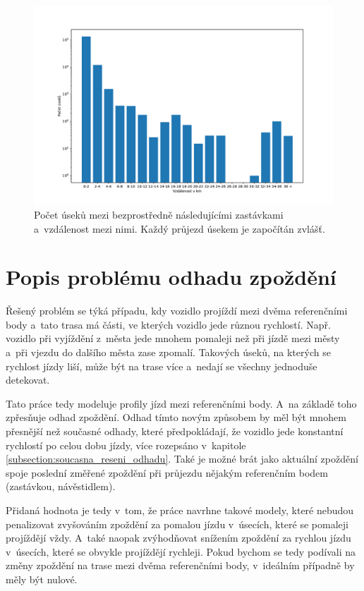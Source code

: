 \begin{figure}
	\centering
  \includegraphics[width=\linewidth]{../img/stop_distances_result}
  \caption{Počet úseků mezi bezprostředně následujícími zastávkami a~vzdálenost mezi nimi. Každý průjezd úsekem je započítán zvlášť.}
  \label{fig:stop_distances_result}
\end{figure}

\section{Popis problému odhadu zpoždění}

Řešený problém se týká případu, kdy vozidlo projíždí mezi dvěma referenčními body a~tato trasa má části, ve kterých vozidlo jede různou rychlostí. Např. vozidlo při vyjíždění z~města jede mnohem pomaleji než při jízdě mezi městy a~při vjezdu do dalšího města zase zpomalí. Takových úseků, na kterých se rychlost jízdy liší, může být na trase více a~nedají se všechny jednoduše detekovat.

\bigbreak

Tato práce tedy modeluje profily jízd mezi referenčními body. A~na základě toho zpřesňuje odhad zpoždění. Odhad tímto novým způsobem by měl být mnohem přesnější než současné odhady, které předpokládají, že vozidlo jede konstantní rychlostí po celou dobu jízdy, více rozepsáno v~kapitole \ref{subsection:soucasna_reseni_odhadu}. Také je možné brát jako aktuální zpoždění spoje poslední změřené zpoždění při průjezdu nějakým referenčním bodem (zastávkou, návěstidlem).

\bigbreak

Přidaná hodnota je tedy v~tom, že práce navrhne takové modely, které nebudou penalizovat zvyšováním zpoždění za pomalou jízdu v~úsecích, které se pomaleji projíždějí vždy. A~také naopak zvýhodňovat snížením zpoždění za rychlou jízdu v~úsecích, které se obvykle projíždějí rychleji. Pokud bychom se tedy podívali na změny zpoždění na trase mezi dvěma referenčními body, v~ideálním případně by měly být nulové.

